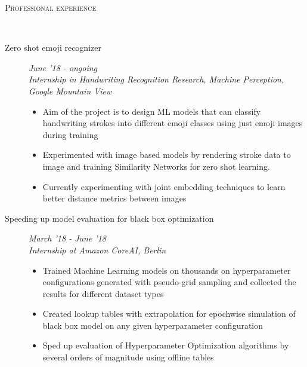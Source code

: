 \documentclass[9pt]{article}
\newenvironment{changemargin}[2]{%
  \begin{list}{}{%
      \setlength{\topsep}{0pt}%
    \setlength{\leftmargin}{#1}%
    \setlength{\rightmargin}{#2}%
    \setlength{\listparindent}{\parindent}%
  \setlength{\itemindent}{\parindent}%
    \setlength{\parsep}{\parskip}%
    }%
  \item[]}{\end{list}
    }
\newcommand{\lineover}{
  \begin{changemargin}{-0.05in}{-0.10in}
    \vspace*{-9pt}
    \hrulefill \\
    \vspace*{-2pt}
  \end{changemargin}
}
\newcommand{\header}[1]{
  \begin{changemargin}{-0.5in}{-0.5in}
    \scshape{#1}\\
        \lineover
  \end{changemargin}
}
\newenvironment{body} {
  \vspace*{-16pt}
        \begin{changemargin}{-0.6in}{-0.65in}
        }	
        {\end{changemargin}
}
\begin{document}
\header{Professional experience}
\begin{body}
  \vspace{14pt}
  
  \begin{description}
  	\item[\normalsize{Zero shot emoji recognizer}] \hfill 
  	\textit{June '18 - ongoing} \\
  	\textit{Internship in Handwriting Recognition Research, Machine Perception, 
        Google Mountain View}
  \begin{itemize}
  	\item Aim of the project is to design ML models that can classify handwriting
          strokes into different emoji classes using just emoji images during
          training 
  	\item Experimented with image based models by rendering stroke data to 
          image and training Similarity Networks for zero shot learning. 
  	\item Currently experimenting with joint embedding techniques to learn 
          better distance metrics between images
  \end{itemize}
  	
  \end{description}

  \begin{description}
    \item[\normalsize{Speeding up model evaluation for black box optimization}] 
      \hfill \textit{March '18 - June '18} \\
      \textit{Internship at Amazon CoreAI, Berlin}
      \begin{itemize}
        \item Trained Machine Learning models on thousands on hyperparameter configurations 
          generated with pseudo-grid sampling and collected the results for different 
          dataset types
        \item Created lookup tables with extrapolation for epochwise
        simulation of black box model on any given hyperparameter configuration
        \item Sped up evaluation of Hyperparameter Optimization algorithms by 
          several orders of magnitude using offline tables
      \end{itemize}


\end{description}
\end{body}
\end{document}
